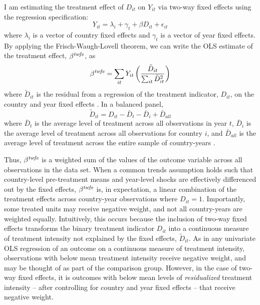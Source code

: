 \documentclass[11pt]{article}
\begin{document}
I am estimating the treatment effect of $D_{it}$ on $Y_{it}$ 
via two-way fixed effects using the regression specification:  
\begin{equation} \label{eq:twfe}
Y_{it} = \lambda_i + \gamma_t + \beta D_{it} + \epsilon_{it}
\end{equation}
where $\lambda_i$ is a vector of country fixed effects and $\gamma_t$ 
is a vector of year fixed effects.  
By applying the Frisch-Waugh-Lovell theorem, we can write the OLS estimate of the treatment effect, $\beta^{\textit{\scriptsize{twfe}}}$, as
\begin{equation} \label{eq:fwl}
\beta^{\textit{\scriptsize{twfe}}} = \sum_{it} Y_{it} \left( \frac{\tilde{D}_{it}}{\sum_{it} \tilde{D}^2_{it} } \right)
\end{equation}
where $\tilde{D}_{it}$ is the residual from a regression of the treatment indicator, $D_{it}$, 
on the country and year fixed effects \cite{Chaisemartin2020}.  In a balanced panel, 
\begin{equation} \label{eq:dtilde}
\tilde{D}_{it} = D_{it} - \bar{D}_t - \bar{D}_i + \bar{D}_{all}
\end{equation}
where $\bar{D}_t$ is the average level of treatment across all observations in year $t$, 
$\bar{D}_i$ is the average level of treatment across all observations for country $i$, and
$\bar{D}_{all}$ is the average level of treatment across the entire sample of country-years \cite{GoodmanBacon2020}.

Thus, $\beta^{\textit{\scriptsize{twfe}}} $ is a weighted sum of the values of the outcome variable across 
all observations in the data set.  When a common trends 
assumption holds such that country-level pre-treatment means and year-level shocks are effectively differenced out 
by the fixed effects, $\beta^{\textit{\scriptsize{twfe}}}$ is, in expectation, a linear combination of the treatment effects 
across country-year observations where $D_{it} = 1$.  Importantly, some treated units may receive negative 
weight, and not all country-years are weighted equally.  Intuitively, this occurs because the inclusion  
of two-way fixed effects transforms the binary treatment indicator $D_{it}$ into a continuous measure of 
treatment intensity not explained by the fixed effects, $\tilde{D}_{it}$.  As in any univariate OLS regression of an 
outcome on a continuous measure of treatment intensity, observations with below mean treatment intensity receive negative weight, and 
may be thought of as part of the comparison group.  However, in the case of two-way fixed effects, it is 
outcomes with below mean levels of \emph{residualized} treatment intensity -- after controlling for country and year 
fixed effects -- that receive negative weight.  
\end{document}
